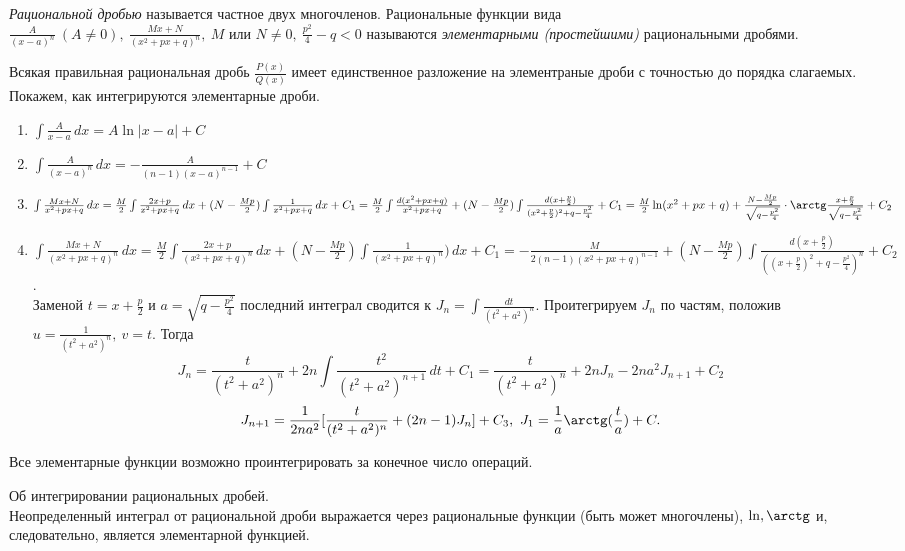     \begin{definition}
        \textit{Рациональной дробью} называется частное двух многочленов.
        Рациональные функции вида $\frac{A}{(x-a)^{n}} \ (A \neq 0), \ \frac{Mx + N}{(x^{2} + px + q)^{n}}, \  M \text{ или } N \neq 0, \  \frac{p^2}{4} - q < 0$
        называются \textit{элементарными (простейшими)} рациональными дробями.
    \end{definition}
    
    Всякая правильная рациональная дробь $\frac{P(x)}{Q(x)}$ имеет единственное разложение на элементраные дроби с точностью до порядка слагаемых.
    Покажем, как интегрируются элементарные дроби.
    
    \begin{enumerate}
        \item $\int \frac{A}{x-a} \,dx = A \ln|x-a| + C$
        \item $\int \frac{A}{(x-a)^{n}} \,dx = - \frac{A}{(n-1)(x-a)^{n-1}} + C$
        \item $\int \frac{Mx+N}{x^2 + px + q} \, dx = \frac{M}{2} \int \frac{2x + p}{x^2 + px + q} \,dx + (N-\frac{Mp}{2})\int \frac{1}{x^2 + px + q} \,dx + C_{1} = \\ \frac{M}{2}\int \frac{d(x^2 + px + q)}{x^2 + px + q} + (N - \frac{Mp}{2})\int \frac{d(x + \frac{p}{2})}{(x^2 + \frac{p}{2})^2 + q - \frac{p^2}{4}} + C_{1} = \frac{M}{2}\ln(x^2 + px + q) + \frac{N - \frac{Mp}{2}}{\sqrt{q - \frac{p^2}{4}}}\cdot \arctg \frac{x + \frac{p}{2}}{\sqrt{q - \frac{p^2}{4}}} + C_{2}$
        \item $\int \frac{Mx + N}{(x^2 + px + q)^{n}} \, dx = \frac{M}{2} \int \frac{2x+p}{(x^2 + px + q)^{n}} \, dx + (N - \frac{Mp}{2}) \int \frac{1}{(x^2 + px + q)^{n}}) \, dx + C_{1} = - \frac{M}{2(n-1)(x^2 + px + q)^{n-1}} + (N - \frac{Mp}{2}) \int \frac{d(x + \frac{p}{2})}{((x + \frac{p}{2})^{2} + q - \frac{p^2}{4})^{n}} + C_{2}$.\\
        Заменой $t = x + \frac{p}{2}$ и $a = \sqrt{q - \frac{p^2}{4}}$ последний интеграл сводится к $J_{n} = \int \frac{dt}{(t^2 + a^2)^{n}}$. Проитегрируем $J_{n}$ по частям, положив $u = \frac{1}{(t^2 + a^2)^{n}}, \ v = t$.
        Тогда 
        \[J_{n} = \frac{t}{(t^2 + a^2)^{n}} + 2n \int \frac{t^2}{(t^2 + a^2)^{n+1}} \, dt + C_{1} = \frac{t}{(t^2 + a^2)^{n}} + 2n J_{n} - 2n a^2 J_{n+1} + C_{2}\]
        \[J_{n+1} = \frac{1}{2n a^2} [\frac{t}{(t^2+a^2)^{n}} + (2n-1)J_{n}] + C_{3}, \ J_{1} = \frac{1}{a} \arctg(\frac{t}{a}) + C.\]
    \end{enumerate}
    
    Все элементарные функции возможно проинтегрировать за конечное число операций.
    
    \begin{theorem}
        Об интегрировании рациональных дробей.\\
        Неопределенный интеграл от рациональной дроби выражается через рациональные функции (быть может многочлены), $\ln, \arctg$ и, следовательно, является элементарной функцией.
    \end{theorem}